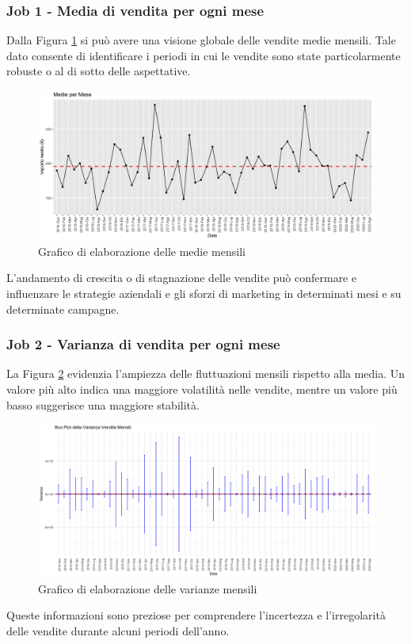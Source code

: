 \subsubsection{Job 1 - Media di vendita per ogni mese}
Dalla Figura \ref{figure:medie} si può avere una visione globale delle vendite medie mensili. Tale dato consente di identificare i periodi in cui le vendite sono state particolarmente robuste o al di sotto delle aspettative.
\begin{figure}[H]
    \centering
    \includegraphics[scale=.3]{img/medie.png}
    \caption{Grafico di elaborazione delle medie mensili}
    \label{figure:medie}
\end{figure}
L'andamento di crescita o di stagnazione delle vendite può confermare e influenzare le strategie aziendali e gli sforzi di marketing in determinati mesi e su determinate campagne.
\subsubsection{Job 2 - Varianza di vendita per ogni mese}
La Figura \ref{figure:varianze} evidenzia l'ampiezza delle fluttuazioni mensili rispetto alla media. Un valore più alto indica una maggiore volatilità nelle vendite, mentre un valore più basso suggerisce una maggiore stabilità.
\begin{figure}[H]
    \centering
    \includegraphics[scale=.25]{img/varianza.png}
    \caption{Grafico di elaborazione delle varianze mensili}
    \label{figure:varianze}
\end{figure}
Queste informazioni sono preziose per comprendere l'incertezza e l'irregolarità delle vendite durante alcuni periodi dell'anno.
